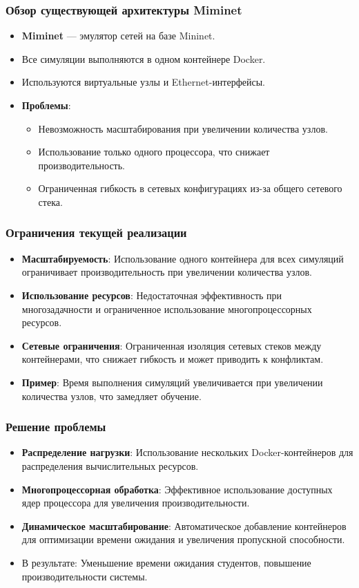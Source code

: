 \documentclass{beamer}
\begin{document}
\begin{frame}[fragile]
  \frametitle{Обзор существующей архитектуры Miminet}
  \begin{itemize}
    \item \textbf{Miminet} — эмулятор сетей на базе Mininet.
    \item Все симуляции выполняются в одном контейнере Docker.
    \item Используются виртуальные узлы и Ethernet-интерфейсы.
    \item \textbf{Проблемы}:
    \begin{itemize}
      \item Невозможность масштабирования при увеличении количества узлов.
      \item Использование только одного процессора, что снижает производительность.
      \item Ограниченная гибкость в сетевых конфигурациях из-за общего сетевого стека.
    \end{itemize}
  \end{itemize}
\end{frame}

\begin{frame}[fragile]
  \frametitle{Ограничения текущей реализации}
  \begin{itemize}
    \item \textbf{Масштабируемость}: Использование одного контейнера для всех симуляций ограничивает производительность при увеличении количества узлов.
    \item \textbf{Использование ресурсов}: Недостаточная эффективность при многозадачности и ограниченное использование многопроцессорных ресурсов.
    \item \textbf{Сетевые ограничения}: Ограниченная изоляция сетевых стеков между контейнерами, что снижает гибкость и может приводить к конфликтам.
    \item \textbf{Пример}: Время выполнения симуляций увеличивается при увеличении количества узлов, что замедляет обучение.
  \end{itemize}
\end{frame}

\begin{frame}[fragile]
  \frametitle{Решение проблемы}
  \begin{itemize}
    \item \textbf{Распределение нагрузки}: Использование нескольких Docker-контейнеров для распределения вычислительных ресурсов.
    \item \textbf{Многопроцессорная обработка}: Эффективное использование доступных ядер процессора для увеличения производительности.
    \item \textbf{Динамическое масштабирование}: Автоматическое добавление контейнеров для оптимизации времени ожидания и увеличения пропускной способности.
    \item В результате: Уменьшение времени ожидания студентов, повышение производительности системы.
  \end{itemize}
\end{frame}
\end{document}
